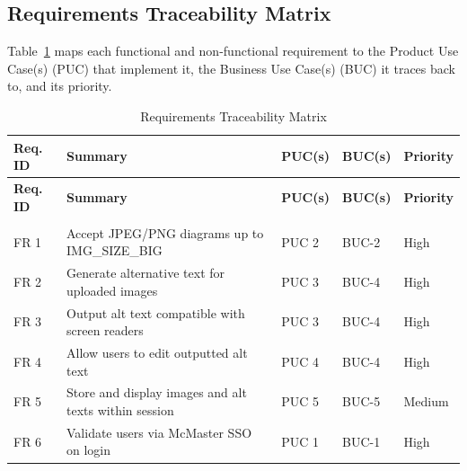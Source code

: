 \documentclass[12pt]{article}
\begin{document}
\subsection{Requirements Traceability Matrix}
\label{sec:traceability}

Table~\ref{tab:traceability} maps each functional and non-functional requirement to the Product Use Case(s) (PUC) that implement it, the Business Use Case(s) (BUC) it traces back to, and its priority.

\begin{longtable}{p{2.2cm}p{5.5cm}p{2.2cm}p{2.0cm}p{1.5cm}}
\caption{Requirements Traceability Matrix}
\label{tab:traceability} \\

\toprule
\textbf{Req. ID} & \textbf{Summary} & \textbf{PUC(s)} & \textbf{BUC(s)} & \textbf{Priority} \\
\midrule
\endfirsthead

\toprule
\textbf{Req. ID} & \textbf{Summary} & \textbf{PUC(s)} & \textbf{BUC(s)} & \textbf{Priority} \\
\midrule
\endhead

\bottomrule
\endfoot

\multicolumn{5}{l}{\textit{Functional Requirements}} \\
\midrule
FR 1   & Accept JPEG/PNG diagrams up to IMG\_SIZE\_BIG              & PUC 2              & BUC-2         & High   \\
FR 2   & Generate alternative text for uploaded images               & PUC 3              & BUC-4         & High   \\
FR 3   & Output alt text compatible with screen readers              & PUC 3              & BUC-4         & High   \\
FR 4   & Allow users to edit outputted alt text                      & PUC 4              & BUC-4         & High   \\
FR 5   & Store and display images and alt texts within session        & PUC 5              & BUC-5         & Medium \\
FR 6   & Validate users via McMaster SSO on login                    & PUC 1              & BUC-1         & High   \\
\midrule


\end{longtable}
\end{document}
